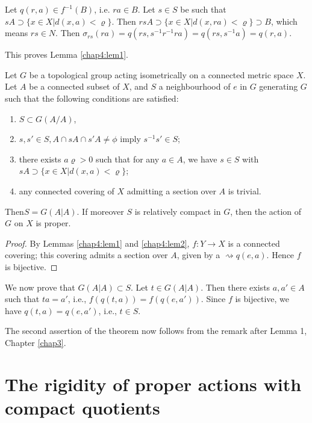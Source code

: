 Let $q(r,a) \in  f^{-1}(B)$, i.e. $ra \in B$. Let $s \in S$ be such
that $sA \supset \bigg\{x \in X \big| d(x,a)< \varrho \bigg\}$. Then
$rsA \supset \bigg\{ x \in X \big| d(x,ra) < \varrho \bigg\} \supset
B$, which means $rs \in N$. Then $\sigma_{rs}(ra) =q (rs, s^{-1}r^{-1}
ra)= q (rs,s^{-1}a)= q(r,a)$. 

This proves Lemma \ref{chap4:lem1}.

\setcounter{thm}{0}
\begin{thm}\label{chap4:thm1}%
  Let $G$ be a topological group acting isometrically on a connected
  metric space $X$. Let $A$ be a  connected subset of $X$, and $S$ a
  neighbourhood of $e$ in $G$ generating $G$ such that the following
  conditions are satisfied: 
  \begin{enumerate}
  \item $S \subset G(A/A)$, 
  \item $s,s' \in S, A \cap sA \cap s' A\neq \phi$ imply  $s^{-1}s' \in S$;
  \item there exists $a \varrho > 0$ such that for any $a \in A$, we
    have $s \in S$ with $sA \supset \bigg\{ x \in X \big| d(x,a) <
    \varrho \bigg\}$; 
  \item any connected covering of $X$ admitting a section over $A$ is trivial. 
  \end{enumerate}
\end{thm}

Then\pageoriginale $S=G(A|A)$. If moreover $S$ is relatively compact in $G$, then
the action of $G$ on $X$ is proper. 

\begin{proof}
  By Lemmas \ref{chap4:lem1} and \ref{chap4:lem2}, $f: Y \to X$ is a
  connected covering; this 
  covering admits a section over $A$, given by a $\rightsquigarrow
  q(e,a)$. Hence $f$ is bijective. 
\end{proof}

We now prove that $G(A|A) \subset S$. Let $t  \in  G(A|A)$. Then there
exists $a, a' \in A$ such that $ta= a'$, i.e., $f(q(t, a))=
f(q(e,a'))$. Since $f$ 
is bijective, we have $q (t,a)= q(e,a')$, i.e., $t \in S$. 

The second assertion of the theorem now follows from the remark after
Lemma 1, Chapter \ref{chap3}. 

\section{The rigidity of proper actions with compact quotients}%

